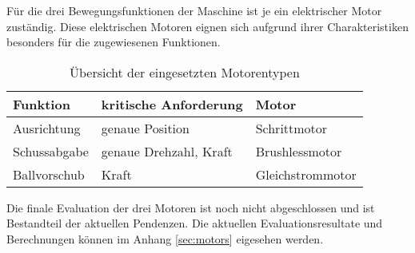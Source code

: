 Für die drei Bewegungsfunktionen der Maschine ist je ein elektrischer
Motor zuständig. Diese elektrischen Motoren eignen sich aufgrund ihrer
Charakteristiken besonders für die zugewiesenen Funktionen. 

\begin{table}[h!]
	\centering
	\begin{tabular}{l l l}
		Funktion & kritische Anforderung & Motor \\
		\hline
		Ausrichtung
			& genaue Position
			& Schrittmotor \\
		Schussabgabe
			& genaue Drehzahl, Kraft
			& Brushlessmotor \\
		Ballvorschub
			& Kraft
			& Gleichstrommotor \\
	\end{tabular}
	\caption{Übersicht der eingesetzten Motorentypen}
\end{table}

Die finale Evaluation der drei Motoren ist noch nicht abgeschlossen
und ist Bestandteil der aktuellen Pendenzen. Die aktuellen
Evaluationsresultate und Berechnungen können im Anhang \ref{sec:motors}
eigesehen werden.
